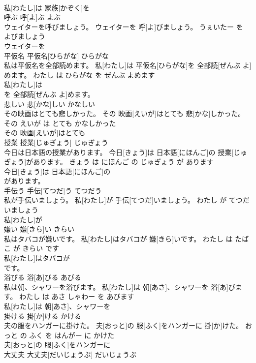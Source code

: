 \documentclass[8pt]{extreport}
\begin{document}
\begin{CJK}{UTF8}{min}
\\	私[わたし]は 家族[かぞく]を
\\	呼ぶ	呼[よ]ぶ	よぶ	
\\	ウェイターを呼びましょう。	ウェイターを 呼[よ]びましょう。	うぇいたー を よびましょう	
\\	ウェイターを
\\	平仮名	平仮名[ひらがな]	ひらがな	
\\	私は平仮名を全部読めます。	私[わたし]は 平仮名[ひらがな]を 全部読[ぜんぶ よ]めます。	わたし は ひらがな を ぜんぶ よめます	
\\	私[わたし]は
\\	を 全部読[ぜんぶ よ]めます。			
\\	悲しい	悲[かな]しい	かなしい	
\\	その映画はとても悲しかった。	その 映画[えいが]はとても 悲[かな]しかった。	その えいが は とても かなしかった	
\\	その 映画[えいが]はとても
\\	授業	授業[じゅぎょう]	じゅぎょう	
\\	今日は日本語の授業があります。	今日[きょう]は 日本語[にほんご]の 授業[じゅぎょう]があります。	きょう は にほんご の じゅぎょう が あります	
\\	今日[きょう]は 日本語[にほんご]の
\\	があります。			
\\	手伝う	手伝[てつだ]う	てつだう	
\\	私が手伝いましょう。	私[わたし]が 手伝[てつだ]いましょう。	わたし が てつだいましょう	
\\	私[わたし]が
\\	嫌い	嫌[きら]い	きらい	
\\	私はタバコが嫌いです。	私[わたし]はタバコが 嫌[きら]いです。	わたし は たばこ が きらい です	
\\	私[わたし]はタバコが
\\	です。			
\\	浴びる	浴[あ]びる	あびる	
\\	私は朝、シャワーを浴びます。	私[わたし]は 朝[あさ]、シャワーを 浴[あ]びます。	わたし は あさ しゃわー を あびます	
\\	私[わたし]は 朝[あさ]、シャワーを
\\	掛ける	掛[か]ける	かける	
\\	夫の服をハンガーに掛けた。	夫[おっと]の 服[ふく]をハンガーに 掛[か]けた。	おっと の ふく を はんがー に かけた	
\\	夫[おっと]の 服[ふく]をハンガーに
\\	大丈夫	大丈夫[だいじょうぶ]	だいじょうぶ	

\end{CJK}
\end{document}
